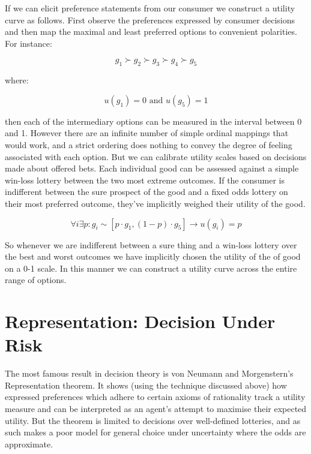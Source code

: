 \documentclass{tufte-handout}
\begin{document}
If we can elicit preference statements from our consumer we construct a utility curve as follows. First observe the preferences expressed by consumer decisions and then map the maximal and least preferred options to convenient polarities. For instance:

$$ g_{1} \succ g_{2} \succ g_{3} \succ g_{4} \succ g_{5} $$

\noindent where:

$$ u(g_{1}) = 0 \text{ and } u(g_{5}) = 1 $$

\noindent then each of the intermediary options can be measured in the interval between 0 and 1. However there are an infinite number of simple ordinal mappings that would work, and a strict ordering does nothing to convey the degree of feeling associated with each option. But we can calibrate utility scales based on decisions made about offered bets. Each individual good can be assessed against a simple win-loss lottery between the two most extreme outcomes. If the consumer is indifferent between the sure prospect of the good and a fixed odds lottery on their most preferred outcome, they've implicitly weighed their utility of the good. 

$$ \forall i \exists  p :  g _{i} \sim [p \cdot g_{1}, (1-p)\cdot g_{5}] \rightarrow u(g_{i}) = p $$

\noindent So whenever we are indifferent between a sure thing and a win-loss lottery over the best and worst outcomes we have implicitly chosen the utility of the of good on a 0-1 scale. In this manner we can construct a utility curve across the entire range of options. 

\section{Representation: Decision Under Risk}
The most famous result in decision theory is von Neumann and Morgenstern's Representation theorem. It shows (using the technique discussed above) how expressed preferences which adhere to certain axioms of rationality track a utility measure and can be interpreted as an agent's attempt to maximise their expected utility.  But the theorem is limited to decisions over well-defined lotteries, and as such makes a poor model for general choice under uncertainty where the odds are approximate. 
\end{document}

